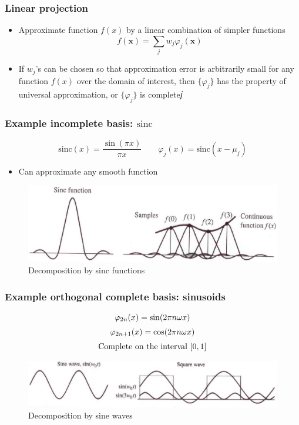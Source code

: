 \documentclass[12pt,notes,mathserif]{beamer}
\begin{document}
\begin{frame}[c]
	\frametitle{Linear projection}
	\begin{itemize}
		\item Approximate function $f(x)$ by a linear combination of simpler functions
		      \[
			      f(\mathbf{x})=\sum_jw_j\varphi_j(\mathbf{x})
		      \]
		\item If $w_j$'s can be chosen so that approximation error is arbitrarily small for any function $f(x)$ over the domain of interest, then $\{\varphi_j\}$ has the property of universal approximation, or $\{\varphi_j\}$ is complete𝑗

	\end{itemize}
\end{frame}
\begin{frame}[c]
	\frametitle{Example incomplete basis: $\mathrm{sinc}$}
	\[
		\mathrm{sinc}(x)=\frac{\sin(\pi x)}{\pi x}\qquad
		\varphi_j(x)=\mathrm{sinc}(x-\mu_j)
	\]\vspace*{-5mm}
	\begin{itemize}
		\item Can approximate any smooth function
	\end{itemize}
	\begin{figure}
		\centering
		\includegraphics[width=0.85\linewidth]{fig/lec77.jpg}
		\caption{Decomposition by sinc functions}
	\end{figure}
\end{frame}

\begin{frame}[c]
	\frametitle{Example orthogonal complete basis: sinusoids}
	\begin{equation*}
		\begin{array}{c}
			\varphi_{2n}(x)=\sin (2\pi n\omega x)   \\[2mm]
			\varphi_{2n+1}(x)=\cos (2\pi n\omega x) \\[2mm]
			{\rm Complete~on~the~interval}~[0,1]
		\end{array}
	\end{equation*}
	\begin{figure}
		\centering
		\includegraphics[width=0.95\linewidth]{fig/lec78.jpg}
		\caption{Decomposition by sine waves}
	\end{figure}
\end{frame}
\end{document}
